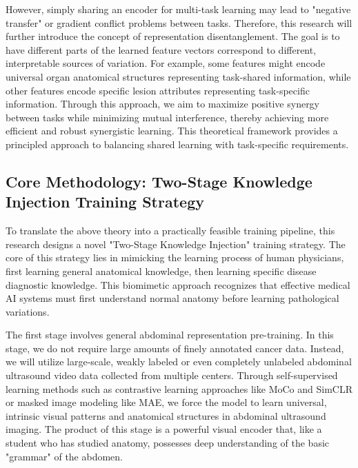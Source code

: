 However, simply sharing an encoder for multi-task learning may lead to "negative transfer" or gradient conflict problems between tasks. Therefore, this research will further introduce the concept of representation disentanglement. The goal is to have different parts of the learned feature vectors correspond to different, interpretable sources of variation. For example, some features might encode universal organ anatomical structures representing task-shared information, while other features encode specific lesion attributes representing task-specific information. Through this approach, we aim to maximize positive synergy between tasks while minimizing mutual interference, thereby achieving more efficient and robust synergistic learning. This theoretical framework provides a principled approach to balancing shared learning with task-specific requirements.

\subsection{Core Methodology: Two-Stage Knowledge Injection Training Strategy}

To translate the above theory into a practically feasible training pipeline, this research designs a novel "Two-Stage Knowledge Injection" training strategy. The core of this strategy lies in mimicking the learning process of human physicians, first learning general anatomical knowledge, then learning specific disease diagnostic knowledge. This biomimetic approach recognizes that effective medical AI systems must first understand normal anatomy before learning pathological variations.

The first stage involves general abdominal representation pre-training. In this stage, we do not require large amounts of finely annotated cancer data. Instead, we will utilize large-scale, weakly labeled or even completely unlabeled abdominal ultrasound video data collected from multiple centers. Through self-supervised learning methods such as contrastive learning approaches like MoCo and SimCLR or masked image modeling like MAE, we force the model to learn universal, intrinsic visual patterns and anatomical structures in abdominal ultrasound imaging. The product of this stage is a powerful visual encoder that, like a student who has studied anatomy, possesses deep understanding of the basic "grammar" of the abdomen.

